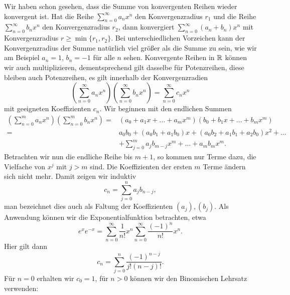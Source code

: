Wir haben schon gesehen, dass die Summe von konvergenten Reihen wieder konvergent ist. Hat die Reihe \(\sum_{n=0}^\infty a_n x^n\) den Konvergenzradius \(r_1\) und die Reihe  \(\sum_{n=0}^\infty b_n x^n\) den Konvergenzradius \(r_2\), dann konvergiert  \(\sum_{n=0}^\infty (a_n+b_n) x^n\)  mit  Konvergenzradius \(r \geq \min\{r_1,r_2\}.\) Bei unterschiedlichen Vorzeichen kann der Konvergenzradius der Summe natürlich viel größer als die Summe zu sein, wie wir am Beispiel \(a_n = 1\), \(b_n = -1\) für alle \(n\) sehen.
Konvergente Reihen in \(\mathbb{R}\) können wir auch multiplizieren, dementsprechend gilt dasselbe für Potenzreihen, diese bleiben auch Potenzreihen, es gilt innerhalb der Konvergenzradien
\begin{equation*}
 \left( \sum_{n=0}^\infty a_n x^n \right) \left( \sum_{n=0}^\infty b_n x^n \right) = \sum_{n=0}^\infty c_n x^n
\end{equation*}
mit geeigneten Koeffizienten \(c_n\). Wir beginnen mit den endlichen Summen
\begin{align*}\left( \sum_{n=0}^m a_n x^n \right) \left( \sum_{n=0}^m b_n x^n \right) =& (a_0 + a_1x+ \ldots + a_m x^m)(b_0 + b_1x+ \ldots + b_m x^m) \\
=& a_0 b_0 + (a_0b_1+a_1b_0)x + (a_0 b_2 + a_1 b_1 + a_2 b_0)x^2 + \ldots \\ & + \sum_{j=0}^m a_j b_{m-j} x^m + \ldots +a_m b_m x^m .
\end{align*}
Betrachten wir nun die endliche Reihe bis \(m+1\), so kommen nur Terme dazu, die Vielfache von \(x^j\) mit \(j > m\) sind. Die Koeffizienten der ersten \(m\) Terme ändern sich nicht mehr. Damit zeigen wir induktiv
\begin{equation*}
 c_n =  \sum_{j=0}^n a_j b_{n-j}  ,
\end{equation*}
man bezeichnet dies auch als Faltung der Koeffizienten \((a_j), (b_j)\).
Als Anwendung können wir die Exponentialfunktion betrachten, etwa
\begin{equation*}
 e^x e^{-x} = \sum_{n=0}^\infty \frac{1}{n!} x^n  \sum_{n=0}^\infty \frac{(-1)^n}{n!} x^n .
\end{equation*}
Hier gilt  dann
\begin{equation*}
 c_n =  \sum_{j=0}^n \frac{(-1)^{n-j}}{j! (n-j)!} .
\end{equation*}
Für \(n=0\) erhalten wir \(c_0 =1\), für \(n > 0\) können wir den Binomischen Lehrsatz verwenden:
\label{metrik/potenzreihen:lemma-3}
